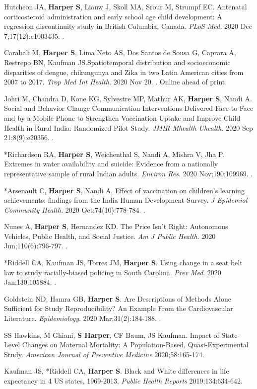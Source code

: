 \documentclass[
  letterpaper,
  DIV=11,
  numbers=noendperiod]{scrartcl}
\begin{document}
Hutcheon JA, \textbf{Harper S}, Liauw J, Skoll MA, Srour M, Strumpf EC.
Antenatal corticosteroid administration and early school age child
development: A regression discontinuity study in British Columbia,
Canada. \emph{PLoS Med.} 2020 Dec 7;17(12):e1003435. .

Carabali M, \textbf{Harper S}, Lima Neto AS, Dos Santos de Sousa G,
Caprara A, Restrepo BN, Kaufman JS.Spatiotemporal distribution and
socioeconomic disparities of dengue, chikungunya and Zika in two Latin
American cities from 2007 to 2017. \emph{Trop Med Int Health.} 2020 Nov
20. . Online ahead of print.

Johri M, Chandra D, Kone KG, Sylvestre MP, Mathur AK, \textbf{Harper S},
Nandi A. Social and Behavior Change Communication Interventions
Delivered Face-to-Face and by a Mobile Phone to Strengthen Vaccination
Uptake and Improve Child Health in Rural India: Randomized Pilot Study.
\emph{JMIR Mhealth Uhealth.} 2020 Sep 21;8(9):e20356. .

*Richardson RA, \textbf{Harper S}, Weichenthal S, Nandi A, Mishra V, Jha
P. Extremes in water availability and suicide: Evidence from a
nationally representative sample of rural Indian adults. \emph{Environ
Res.} 2020 Nov;190:109969. .

*Arsenault C, \textbf{Harper S}, Nandi A. Effect of vaccination on
children's learning achievements: findings from the India Human
Development Survey. \emph{J Epidemiol Community Health.} 2020
Oct;74(10):778-784. .

Nunes A, \textbf{Harper S}, Hernandez KD. The Price Isn't Right:
Autonomous Vehicles, Public Health, and Social Justice. \emph{Am J
Public Health}. 2020 Jun;110(6):796-797. .

*Riddell CA, Kaufman JS, Torres JM, \textbf{Harper S}. Using change in a
seat belt law to study racially-biased policing in South Carolina.
\emph{Prev Med}. 2020 Jan;130:105884. .

Goldstein ND, Hamra GB, \textbf{Harper S}. Are Descriptions of Methods
Alone Sufficient for Study Reproducibility? An Example From the
Cardiovascular Literature. \emph{Epidemiology}. 2020 Mar;31(2):184-188.
.

SS Hawkins, M Ghiani, \textbf{S Harper}, CF Baum, JS Kaufman. Impact of
State-Level Changes on Maternal Mortality: A Population-Based,
Quasi-Experimental Study. \emph{American Journal of Preventive Medicine}
2020;58:165-174.

Kaufman JS, *Riddell CA, \textbf{Harper S}. Black and White differences
in life expectancy in 4 US states, 1969-2013. \emph{Public Health
Reports} 2019;134:634-642.
\end{document}
